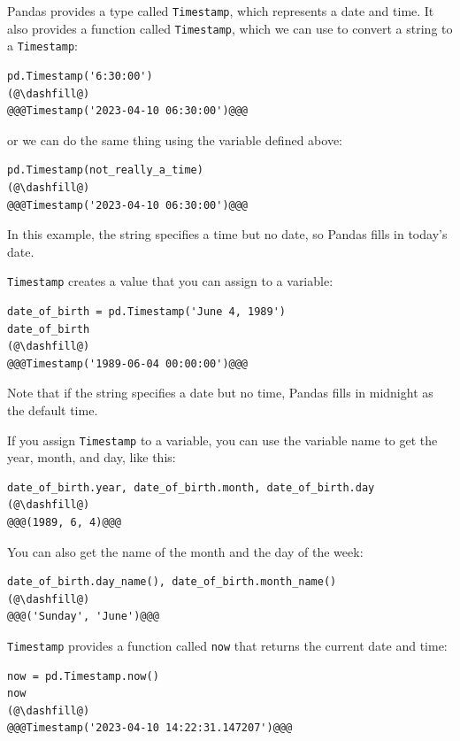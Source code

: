 Pandas provides a type called \passthrough{\lstinline!Timestamp!}, which
represents a date and time. It also provides a function called \passthrough{\lstinline!Timestamp!},
which we can use to convert a string to a
\passthrough{\lstinline!Timestamp!}:

\begin{lstlisting}[]
pd.Timestamp('6:30:00')
(@\dashfill@)
@@@Timestamp('2023-04-10 06:30:00')@@@
\end{lstlisting}
or we can do the same thing using the variable defined above:

\begin{lstlisting}[]
pd.Timestamp(not_really_a_time)
(@\dashfill@)
@@@Timestamp('2023-04-10 06:30:00')@@@
\end{lstlisting}
In this example, the string specifies a time but no date, so Pandas fills in today's date.

\passthrough{\lstinline!Timestamp!} creates a value that you can assign
to a variable:

\begin{lstlisting}[]
date_of_birth = pd.Timestamp('June 4, 1989')
date_of_birth
(@\dashfill@)
@@@Timestamp('1989-06-04 00:00:00')@@@
\end{lstlisting}

Note that if the string specifies a date but no time, Pandas fills in midnight as
the default time.

If you assign \passthrough{\lstinline!Timestamp!} to a variable, you
can use the variable name to get the year, month, and day, like this:

\begin{lstlisting}[]
date_of_birth.year, date_of_birth.month, date_of_birth.day
(@\dashfill@)
@@@(1989, 6, 4)@@@
\end{lstlisting}

You can also get the name of the month and the day of the week:

\begin{lstlisting}[]
date_of_birth.day_name(), date_of_birth.month_name()
(@\dashfill@)
@@@('Sunday', 'June')@@@
\end{lstlisting}

\passthrough{\lstinline!Timestamp!} provides a function called
\passthrough{\lstinline!now!} that returns the current date and time:

\begin{lstlisting}[]
now = pd.Timestamp.now()
now
(@\dashfill@)
@@@Timestamp('2023-04-10 14:22:31.147207')@@@
\end{lstlisting}

